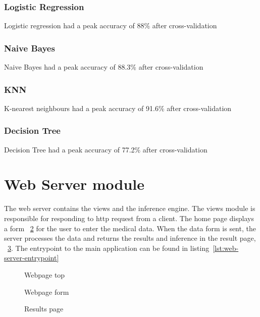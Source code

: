 \subsubsection{Logistic Regression}
Logistic regression had a peak accuracy of 88\% after cross-validation

\subsubsection{Naive Bayes}
Naive Bayes had a peak accuracy of 88.3\% after cross-validation

\subsubsection{KNN}
K-nearest neighbours had a peak accuracy of 91.6\% after cross-validation

\subsubsection{Decision Tree}
Decision Tree had a peak accuracy of 77.2\% after cross-validation

\section{Web Server module}
The web server contains the views and the inference engine. The views module is responsible for responding to http request from a client. The home page displays a form \figurename~\ref{fig:site-2} for the user to enter the medical data. When the data form is sent, the server processes the data and returns the results and inference in the result page, \figurename~\ref{fig:site-3}. The entrypoint to the main application can be found in listing~\ref{lst:web-server-entrypoint}


\begin{figure}[htb]
	\centering
	\caption{Webpage top}
	\label{fig:site-1}
\end{figure}

\begin{figure}[htb]
	\centering
	\caption{Webpage form}
	\label{fig:site-2}
\end{figure}
\begin{figure}[htb]
	\centering
	\caption{Results page}
	\label{fig:site-3}
\end{figure}



